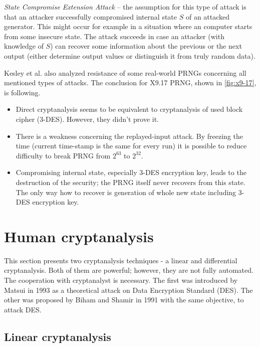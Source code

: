\documentclass[
    digital,    %
    oneside,    %
    color,
    11pt,
    nocover,
    notable,
    nolof,
    nolot,
    final
]{fithesis3}
\renewcommand\_{\textunderscore\allowbreak}
\begin{document}
\textit{State Compromise Extension Attack} -- the assumption for this type of attack is that an attacker successfully compromised internal state $S$ of an attacked generator. This might occur for example in a situation where an computer starts from some insecure state. The attack succeeds in case an attacker (with knowledge of $S$) can recover some information about the previous or the next output (either determine output values or distinguish it from truly random data). 

Kesley et al. \cite{kelsey1998cryptanalytic} also analyzed resistance of some real-world PRNGs concerning all mentioned types of attacks. The conclusion for X9.17 PRNG, shown in \cref{fig:x9-17}, is following.

\begin{itemize}
	\item Direct cryptanalysis seems to be equivalent to cryptanalysis of used block cipher (3-DES). However, they didn't prove it.
	
	\item There is a weakness concerning the replayed-input attack. By freezing the time (current time-stamp is the same for every run) it is possible to reduce difficulty to break PRNG from $2^{63}$ to $2^{32}$.
	
	\item Compromising internal state, especially 3-DES encryption key, leads to the destruction of the security; the PRNG itself never recovers from this state. The only way how to recover is generation of whole new state including 3-DES encryption key.
\end{itemize}

\section{Human cryptanalysis}

This section presents two cryptanalysis techniques - a linear and differential cryptanalysis. Both of them are powerful; however, they are not fully automated. The cooperation with cryptanalyst is necessary. The first was introduced by Matsui \cite{matsui1993linear} in 1993 as a theoretical attack on Data Encryption Standard (DES). The other was proposed by Biham and Shamir \cite{Biham1991} in 1991 with the same objective, to attack DES.


\subsection{Linear cryptanalysis}
\end{document}
